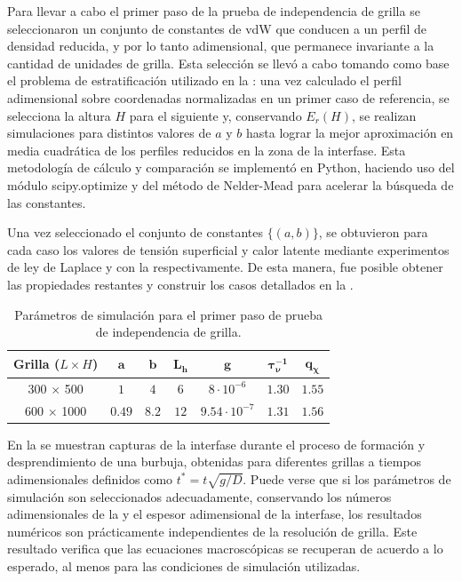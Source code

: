 Para llevar a cabo el primer paso de la prueba de independencia de grilla se seleccionaron un conjunto de constantes de vdW que conducen a un perfil de densidad reducida, y por lo tanto adimensional, que permanece invariante a la cantidad de unidades de grilla. Esta selecci\'on se llev\'o a cabo tomando como base el problema de estratificaci\'on utilizado en la : una vez calculado el perfil adimensional sobre coordenadas normalizadas en un primer caso de referencia, se selecciona la altura $H$ para el siguiente y, conservando $E_r(H)$, se realizan simulaciones para distintos valores de $a$ y $b$ hasta lograr la mejor aproximaci\'on en media cuadr\'atica de los perfiles reducidos en la zona de la interfase. Esta metodolog\'ia  de c\'alculo y comparaci\'on se implement\'o en Python, haciendo uso del m\'odulo scipy.optimize y del m\'etodo de Nelder-Mead para acelerar la b\'usqueda de las constantes.

Una vez seleccionado el conjunto de constantes $\{(a,b)\}$, se obtuvieron para cada caso los valores de tensi\'on superficial y calor latente mediante experimentos de ley de Laplace y con la  respectivamente. De esta manera, fue posible obtener las propiedades restantes y construir los casos detallados en la .
\begin{table}[ht]
	\centering
    \begin{tabular}{c c c c c c c}
	    \toprule
        \bf Grilla ($L\times H$) & $\bm{a}$ & $\bm{b}$ & $\bm{L_h}$ & $\bm{g}$ & $\bm{\tau_{\nu}^{-1}}$ & $\bm{q_{\chi}}$ \\
        \midrule
		300 $\times$ 500   & $1$ & $4$ & $6$ & $8\cdot 10^{-6}$ & $1.30$ & $1.55$ \\
		600 $\times$ 1000  & $0.49$ & $8.2$ & $12$ & $9.54\cdot 10^{-7}$ & $1.31$ & $1.56$ \\		
        \bottomrule
	\end{tabular}
	\caption{Par\'ametros de simulaci\'on para el primer paso de prueba de independencia de grilla.}
	\label{tab:gridindep_step1}
\end{table}  

En la  se muestran capturas de la interfase durante el proceso de formaci\'on y desprendimiento de una burbuja, obtenidas para diferentes grillas a tiempos adimensionales definidos como $t^* = t \sqrt{g/D}$. Puede verse que si los par\'ametros de simulaci\'on son seleccionados adecuadamente, conservando los n\'umeros adimensionales de la  y el espesor adimensional de la interfase, los resultados num\'ericos son pr\'acticamente independientes de la resoluci\'on de grilla. Este resultado verifica que las ecuaciones macrosc\'opicas se recuperan de acuerdo a lo esperado, al menos para las condiciones de simulaci\'on utilizadas.

